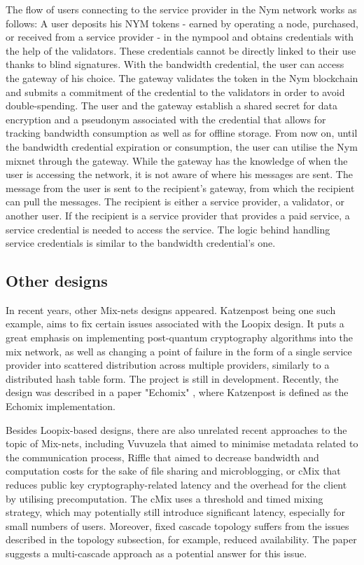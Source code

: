 The flow of users connecting to the service provider in the Nym network works as follows: A user deposits his NYM tokens - earned by operating a node, purchased, or received from a service provider - in the nympool and obtains credentials with the help of the validators. These credentials cannot be directly linked to their use thanks to blind signatures. With the bandwidth credential, the user can access the gateway of his choice. The gateway validates the token in the Nym blockchain and submits a commitment of the credential to the validators in order to avoid double-spending. The user and the gateway establish a shared secret for data encryption and a pseudonym associated with the credential that allows for tracking bandwidth consumption as well as for offline storage. From now on, until the bandwidth credential expiration or consumption, the user can utilise the Nym mixnet through the gateway. While the gateway has the knowledge of when the user is accessing the network, it is not aware of where his messages are sent. The message from the user is sent to the recipient’s gateway, from which the recipient can pull the messages. The recipient is either a service provider, a validator, or another user. If the recipient is a service provider that provides a paid service, a service credential is needed to access the service. The logic behind handling service credentials is similar to the bandwidth credential’s one.

\subsection{Other designs}
In recent years, other Mix-nets designs appeared.
Katzenpost \cite{katzenpost} being one such example, aims to fix certain issues associated with the Loopix design. It puts a great emphasis on implementing post-quantum cryptography algorithms into the mix network, as well as changing a point of failure in the form of a single service provider into scattered distribution across multiple providers, similarly to a distributed hash table form. The project is still in development. Recently, the design was described in a paper "Echomix" \cite{echomix}, where Katzenpost is defined as the Echomix implementation.

Besides Loopix-based designs, there are also unrelated recent approaches to the topic of Mix-nets, including Vuvuzela \cite{vuvuzela} that aimed to minimise metadata related to the communication process, Riffle \cite{riffle} that aimed to decrease bandwidth and computation costs for the sake of file sharing and microblogging, or cMix \cite{cmix} that reduces public key cryptography-related latency and the overhead for the client by utilising precomputation. The cMix uses a threshold and timed mixing strategy, which may potentially still introduce significant latency, especially for small numbers of users. Moreover, fixed cascade topology suffers from the issues described in the topology subsection, for example, reduced availability. The paper suggests a multi-cascade approach as a potential answer for this issue.

